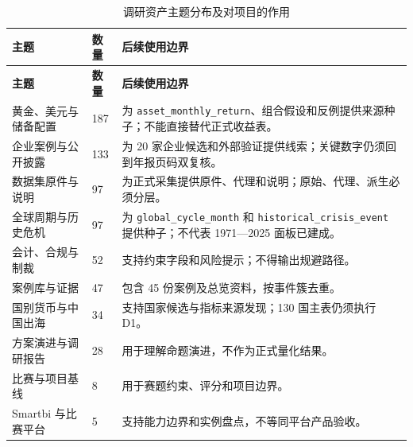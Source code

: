 \documentclass[UTF8,fontset=windows,12pt,openany]{ctexbook}
\newcommand{\Field}[1]{{\small\nolinkurl{#1}}}
\begin{document}
\begin{longtable}{p{4.6cm}p{1.8cm}p{8.0cm}}
\caption{调研资产主题分布及对项目的作用}\label{tab:v41-category-counts}\\
\toprule
\textbf{主题} & \textbf{数量} & \textbf{后续使用边界}\\
\midrule
\endfirsthead
\toprule \textbf{主题} & \textbf{数量} & \textbf{后续使用边界}\\ \midrule
\endhead
黄金、美元与储备配置 & 187 & 为 \Field{asset_monthly_return}、组合假设和反例提供来源种子；不能直接替代正式收益表。\\
企业案例与公开披露 & 133 & 为 20 家企业候选和外部验证提供线索；关键数字仍须回到年报页码双复核。\\
数据集原件与说明 & 97 & 为正式采集提供原件、代理和说明；原始、代理、派生必须分层。\\
全球周期与历史危机 & 97 & 为 \Field{global_cycle_month} 和 \Field{historical_crisis_event} 提供种子；不代表 1971—2025 面板已建成。\\
会计、合规与制裁 & 52 & 支持约束字段和风险提示；不得输出规避路径。\\
案例库与证据 & 47 & 包含 45 份案例及总览资料，按事件簇去重。\\
国别货币与中国出海 & 34 & 支持国家候选与指标来源发现；130 国主表仍须执行 D1。\\
方案演进与调研报告 & 28 & 用于理解命题演进，不作为正式量化结果。\\
比赛与项目基线 & 8 & 用于赛题约束、评分和项目边界。\\
Smartbi 与比赛平台 & 5 & 支持能力边界和实例盘点，不等同平台产品验收。\\
\bottomrule
\end{longtable}
\end{document}
